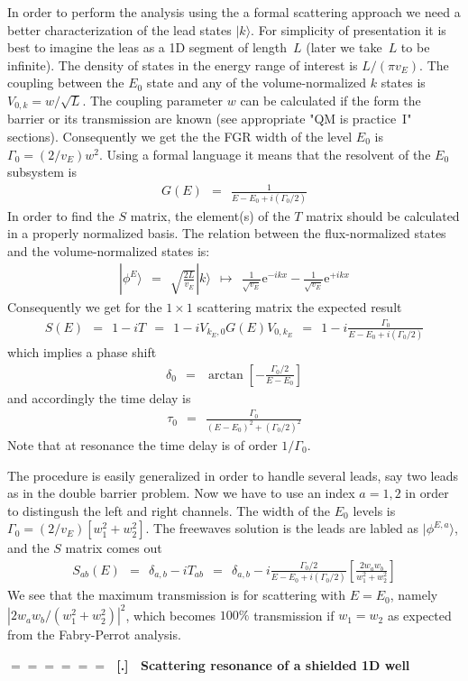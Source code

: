 \documentclass[onecolumn,fleqn]{revtex4}
\newcommand{\eexp}{\mathrm{e}^}
\newcommand{\beq}{\begin{eqnarray}}
\newcommand{\eeq}{\end{eqnarray}}
\renewcommand{\thesubsection}{\arabic{subsection}}
\renewcommand{\thesubsubsection}{\arabic{subsubsection}}
\newcommand{\sheadC}[1]
{
\addtocounter{subsubsection}{1}
\vspace{5mm}
{\Large\bf $=\!=\!=\!=\!=\!=\;$ [\thesubsection.\thesubsubsection] \ #1}  
\nopagebreak
\phantomsection
}
\begin{document}
In order to perform the analysis using the a formal 
scattering approach we need a better characterization 
of the lead states $|k\rangle$. For simplicity of presentation  
it is best to imagine the leas as a 1D segment of length~$L$  
(later we take~$L$ to be infinite). The density 
of states in the energy range of interest is $L/(\pi v_E)$. 
The coupling between the $E_0$ state and any of the 
volume-normalized $k$ states is ${V_{0,k}=w/\sqrt{L}}$. 
The coupling parameter $w$ can be calculated 
if the form the barrier or its transmission are known
(see appropriate "QM is practice~I" sections).    
Consequently we get the the FGR width of the level $E_0$ 
is  ${\Gamma_0=(2/v_E)w^2}$. Using a formal language 
it means that the resolvent of the $E_0$ subsystem is 
\beq
G(E) \ \ = \ \ \frac{1}{E-E_0+i(\Gamma_0/2)}
\eeq 
In order to find the $S$ matrix, the element(s)  
of the $T$ matrix should be calculated in a 
properly normalized basis. The relation between the 
flux-normalized states and the volume-normalized states is: 
\beq
|\phi^E\rangle \ \ = \ \ \sqrt{\frac{2L}{v_E}} |k\rangle 
\ \ \longmapsto \ \  \frac{1}{\sqrt{v_E}}\eexp{-ikx} - \frac{1}{\sqrt{v_E}}\eexp{+ikx}
\eeq 
Consequently we get for the $1\times1$ scattering matrix the expected result 
\beq
S(E) \ \ = \ \ 1-iT \ \ = \ \ 1-iV_{k_E,0}G(E)V_{0,k_E} \ \ = \ \ 1-i\frac{\Gamma_0}{E-E_0+i(\Gamma_0/2)}
\eeq 
which implies a phase shift
\beq
\delta_{0} \ \ = \ \ \arctan\left[-\frac{\Gamma_0/2}{E-E_0}\right] 
\eeq 
and accordingly the time delay is 
\beq
\tau_0 \ \ = \ \ \frac{\Gamma_0}{(E-E_0)^2+(\Gamma_0/2)^2}
\eeq 
Note that at resonance the time delay is of order $1/\Gamma_0$.

The procedure is easily generalized in order to handle 
several leads, say two leads as in the double barrier problem.
Now we have to use an index ${a=1,2}$ in order to distingush 
the left and right channels. The width of the $E_0$ levels 
is ${\Gamma_0=(2/v_E)[w_1^2+w_2^2]}$. 
The freewaves solution is the leads are labled as $|\phi^{E,a}\rangle$, 
and the $S$ matrix comes out  
\beq
S_{ab}(E) \ \ = \ \ \delta_{a,b}-iT_{ab} \ \ = \ \ 
\delta_{a,b}-i\frac{\Gamma_0/2}{E-E_0+i(\Gamma_0/2)}
\left[\frac{2w_aw_b}{w_1^2+w_2^2}\right]
\eeq 
We see that the maximum transmission is for scattering with ${E=E_0}$,  
namely ${|2w_aw_b/(w_1^2+w_2^2)|^2}$, which becomes $100\%$ transmission  
if ${w_1=w_2}$ as expected from the Fabry-Perrot analysis. 


\sheadC{Scattering resonance of a shielded 1D well}
\end{document}
